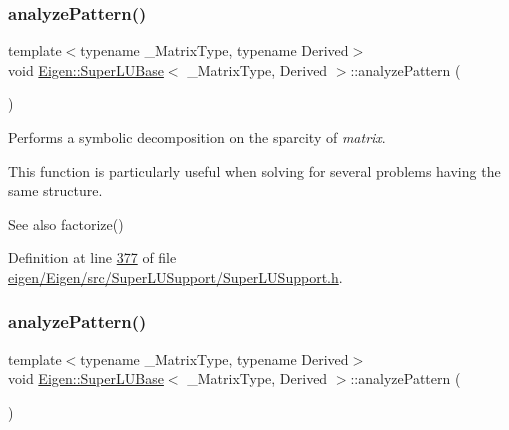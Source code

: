 \subsubsection{\texorpdfstring{analyze\+Pattern()}{analyzePattern()}\hspace{0.1cm}{\footnotesize\ttfamily [1/2]}}
{\footnotesize\ttfamily template$<$typename \+\_\+\+Matrix\+Type, typename Derived$>$ \\
void \hyperlink{class_eigen_1_1_super_l_u_base}{Eigen\+::\+Super\+L\+U\+Base}$<$ \+\_\+\+Matrix\+Type, Derived $>$\+::analyze\+Pattern (\begin{DoxyParamCaption}\item[{const Matrix\+Type \&}]{ }\end{DoxyParamCaption})\hspace{0.3cm}{\ttfamily [inline]}}

Performs a symbolic decomposition on the sparcity of {\itshape matrix}.

This function is particularly useful when solving for several problems having the same structure.

\begin{DoxySeeAlso}{See also}
factorize() 
\end{DoxySeeAlso}


Definition at line \hyperlink{eigen_2_eigen_2src_2_super_l_u_support_2_super_l_u_support_8h_source_l00377}{377} of file \hyperlink{eigen_2_eigen_2src_2_super_l_u_support_2_super_l_u_support_8h_source}{eigen/\+Eigen/src/\+Super\+L\+U\+Support/\+Super\+L\+U\+Support.\+h}.

\mbox{\label{class_eigen_1_1_super_l_u_base_a2d3f48425328d9b3cbdca369889007f3}} 
\subsubsection{\texorpdfstring{analyze\+Pattern()}{analyzePattern()}\hspace{0.1cm}{\footnotesize\ttfamily [2/2]}}
{\footnotesize\ttfamily template$<$typename \+\_\+\+Matrix\+Type, typename Derived$>$ \\
void \hyperlink{class_eigen_1_1_super_l_u_base}{Eigen\+::\+Super\+L\+U\+Base}$<$ \+\_\+\+Matrix\+Type, Derived $>$\+::analyze\+Pattern (\begin{DoxyParamCaption}\item[{const Matrix\+Type \&}]{ }\end{DoxyParamCaption})\hspace{0.3cm}{\ttfamily [inline]}}

